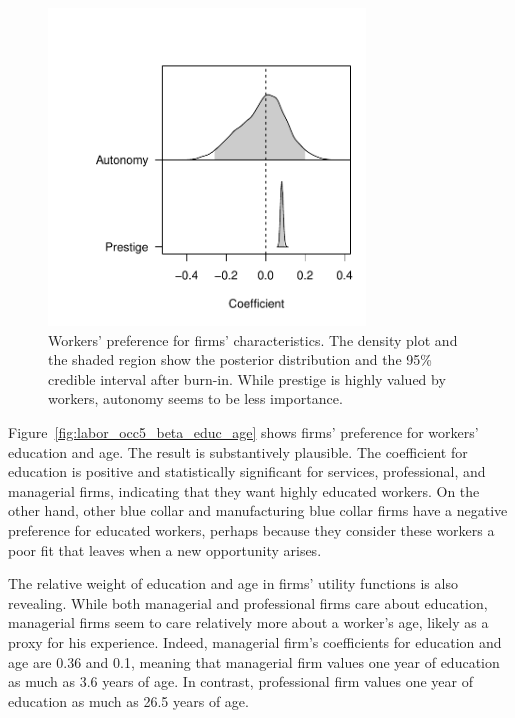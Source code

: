 \begin{figure}[tbp]
  \centering
  \includegraphics[width=0.75\textwidth,keepaspectratio]{../figure/labor_occ5_alpha}
  \caption[Workers' preference in the US labor market.]{Workers' preference for firms' characteristics. The density plot and the
    shaded region show the posterior distribution and the 95\% credible interval
    after burn-in. While prestige is highly valued by workers, autonomy seems to
    be less importance.}
  \label{fig:labor_occ5_alpha}
\end{figure}

Figure~\ref{fig:labor_occ5_beta_educ_age} shows firms' preference for workers'
education and age. The result is substantively plausible. The coefficient for
education is positive and statistically significant for services, professional,
and managerial firms, indicating that they want highly educated workers. On the
other hand, other blue collar and manufacturing blue collar firms have a
negative preference for educated workers, perhaps because they consider these
workers a poor fit that leaves when a new opportunity arises.

The relative weight of education and age in firms' utility functions is also
revealing. While both managerial and professional firms care about education,
managerial firms seem to care relatively more about a worker's age, likely as a
proxy for his experience. Indeed, managerial firm's coefficients for education
and age are 0.36 and 0.1, meaning that managerial firm values one year of
education as much as 3.6 years of age. In contrast, professional firm values one
year of education as much as 26.5 years of age.

